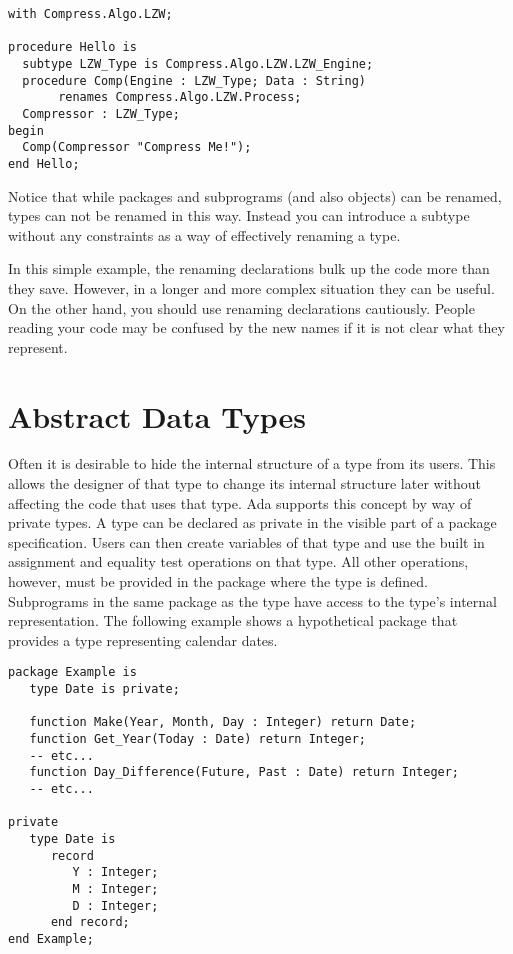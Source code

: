 \begin{lstlisting}
with Compress.Algo.LZW;

procedure Hello is
  subtype LZW_Type is Compress.Algo.LZW.LZW_Engine;
  procedure Comp(Engine : LZW_Type; Data : String)
       renames Compress.Algo.LZW.Process;
  Compressor : LZW_Type;
begin
  Comp(Compressor "Compress Me!");
end Hello;
\end{lstlisting}

Notice that while packages and subprograms (and also objects) can be renamed, types can not be
renamed in this way. Instead you can introduce a subtype without any constraints as a way of
effectively renaming a type.

In this simple example, the renaming declarations bulk up the code more than they save. However,
in a longer and more complex situation they can be useful. On the other hand, you should use
renaming declarations cautiously. People reading your code may be confused by the new names if
it is not clear what they represent.

\section{Abstract Data Types}

Often it is desirable to hide the internal structure of a type from its users. This allows the
designer of that type to change its internal structure later without affecting the code that
uses that type. Ada supports this concept by way of private types. A type can be declared as
private in the visible part of a package specification. Users can then create variables of that
type and use the built in assignment and equality test operations on that type. All other
operations, however, must be provided in the package where the type is defined. Subprograms in
the same package as the type have access to the type's internal representation. The following
example shows a hypothetical package that provides a type representing calendar dates.

\begin{lstlisting}
package Example is
   type Date is private;

   function Make(Year, Month, Day : Integer) return Date;
   function Get_Year(Today : Date) return Integer;
   -- etc...
   function Day_Difference(Future, Past : Date) return Integer;
   -- etc...

private
   type Date is
      record
         Y : Integer;
         M : Integer;
         D : Integer;
      end record;
end Example;
\end{lstlisting}

